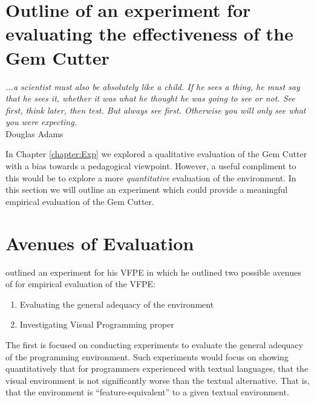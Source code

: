 \label{chapter:misc}

\section{Outline of an experiment for evaluating the effectiveness of the Gem Cutter}

\begin{flushright}
\textit{...a scientist must also be absolutely like a child.  If he sees a thing, he must say that he sees it, whether it was what he thought he was going to see or not.  See first, think later, then test.  But always see first.  Otherwise you will only see what you were expecting.}
\\
Douglas Adams \cite{Adams84} \\
\end{flushright}

In Chapter \ref{chapter:Exp} we explored a qualitative evaluation of the Gem Cutter with a bias towards a pedagogical viewpoint.  However, a useful compliment to this would be to explore a more \emph{quantitative} evaluation of the environment.  In this section we will outline an experiment which could provide a meaningful empirical evaluation of the Gem Cutter.

\section{Avenues of Evaluation}

\cite{Kelso02} outlined an experiment for his VFPE in which he outlined two possible avenues of for empirical evaluation of the VFPE:

\begin{enumerate}
	\item Evaluating the general adequacy of the environment
	\item Investigating Visual Programming proper
\end{enumerate}

The first is focused on conducting experiments to evaluate the general adequacy of the programming environment.  Such experiments would focus on showing quantitatively that for programmers experienced with textual languages, that the visual environment is not significantly worse than the textual alternative.  That is, that the environment is ``feature-equivalent'' to a given textual environment.

